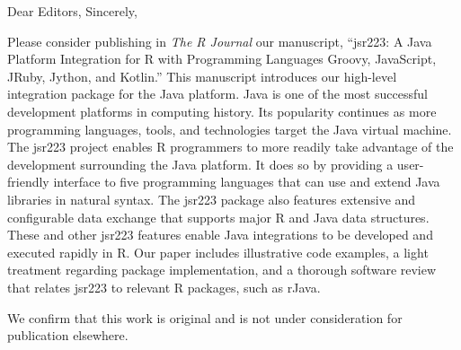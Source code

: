 \documentclass[11pt,signature,logo]{BYUstatletter}
\begin{document}
\begin{myletter}
{}
{}
{Dear Editors,}
{Sincerely,}

Please consider publishing in \emph{The R Journal} our manuscript, ``jsr223: A
Java Platform Integration for R with Programming Languages Groovy, JavaScript,
JRuby, Jython, and Kotlin.'' This manuscript introduces our high-level
integration package for the Java platform. Java is one of
the most successful development platforms in computing history. Its popularity
continues as more programming languages, tools, and technologies target the
Java virtual machine. The jsr223 project enables R programmers to more readily
take advantage of the development surrounding the Java platform. It does so by
providing a user-friendly interface to five programming languages that can use
and extend Java libraries in natural syntax. The
jsr223 package also features extensive and configurable data exchange that
supports major R and Java data structures. These and other jsr223
features enable Java integrations to be developed and executed rapidly in R.
Our paper includes illustrative code examples, a light treatment regarding
package implementation, and a thorough software review that relates jsr223 to
relevant R packages, such as rJava.

We confirm that this work is original and is not under consideration for
publication elsewhere.

\end{myletter}
\end{document}
